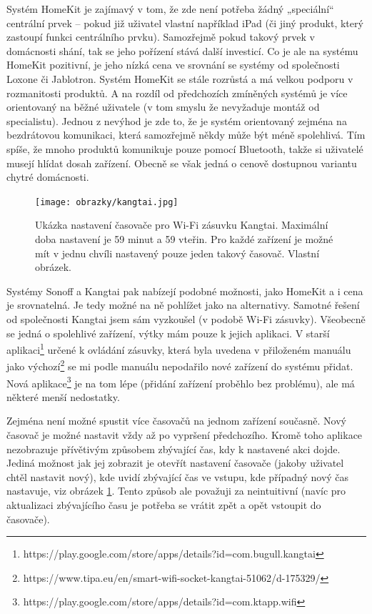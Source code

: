 Systém HomeKit je zajímavý v tom, že zde není potřeba žádný „speciální“ centrální prvek – pokud již uživatel vlastní například iPad (či jiný produkt, který zastoupí funkci centrálního prvku). Samozřejmě pokud takový prvek v domácnosti shání, tak se jeho pořízení stává další investicí. Co je ale na systému HomeKit pozitivní, je jeho nízká cena ve srovnání se systémy od společnosti Loxone či Jablotron. Systém HomeKit se stále rozrůstá a má velkou podporu v rozmanitosti produktů. A na rozdíl od předchozích zmíněných systémů je více orientovaný na běžné uživatele (v tom smyslu že nevyžaduje montáž od specialistu). Jednou z nevýhod je zde to, že je systém orientovaný zejména na bezdrátovou komunikaci, která samozřejmě někdy může být méně spolehlivá. Tím spíše, že mnoho produktů komunikuje pouze pomocí Bluetooth, takže si uživatelé musejí hlídat dosah zařízení. Obecně se však jedná o cenově dostupnou variantu chytré domácnosti.

\begin{figure}[hbt]
	\centering
	\texttt{[image: obrazky/kangtai.jpg]}
	\caption{Ukázka nastavení časovače pro Wi-Fi zásuvku Kangtai. Maximální doba nastavení je 59 minut a 59 vteřin. Pro každé zařízení je možné mít v jednu chvíli nastavený pouze jeden takový časovač. Vlastní obrázek.}
	\label{kangtai}
\end{figure}

Systémy Sonoff a Kangtai pak nabízejí podobné možnosti, jako HomeKit a i cena je srovnatelná. Je tedy možné na ně pohlížet jako na alternativy. Samotné řešení od společnosti Kangtai jsem sám vyzkoušel (v podobě Wi-Fi zásuvky). Všeobecně se jedná o spolehlivé zařízení, výtky mám pouze k jejich aplikaci. V starší aplikaci\footnote{https://play.google.com/store/apps/details?id=com.bugull.kangtai} určené k ovládání zásuvky, která byla uvedena v přiloženém manuálu jako výchozí\footnote{https://www.tipa.eu/en/smart-wifi-socket-kangtai-51062/d-175329/} se mi podle manuálu nepodařilo nové zařízení do systému přidat. Nová aplikace\footnote{https://play.google.com/store/apps/details?id=com.ktapp.wifi} je na tom lépe (přidání zařízení proběhlo bez problému), ale má některé menší nedostatky.

Zejména není možné spustit více časovačů na jednom zařízení současně. Nový časovač je možné nastavit vždy až po vypršení předchozího. Kromě toho aplikace nezobrazuje přívětivým způsobem zbývající čas, kdy k nastavené akci dojde. Jediná možnost jak jej zobrazit je otevřít nastavení časovače (jakoby uživatel chtěl nastavit nový), kde uvidí zbývající čas ve vstupu, kde případný nový čas nastavuje, viz obrázek \ref{kangtai}. Tento způsob ale považuji za neintuitivní (navíc pro aktualizaci zbývajícího času je potřeba se vrátit zpět a opět vstoupit do časovače). 

